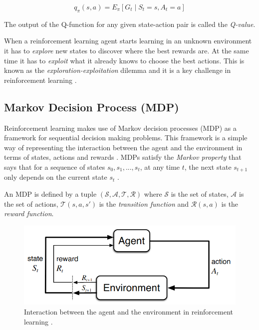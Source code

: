 \begin{equation}
q_\pi \left( s,a \right) = E_\pi \left[ G_{t}\mid S_{t}=s,A_{t}=a \right] 
\label{eq:q-function}
\end{equation}


The output of the Q-function for any given state-action pair is called the \textit{Q-value}. 

When a reinforcement learning agent starts learning in an unknown environment it has to \textit{explore} new states to discover where the best rewards are. At the same time it has to \textit{exploit} what it already knows to choose the best actions. This is known as the \textit{exploration-exploitation }dilemma and it is a key challenge in reinforcement learning \cite{Sutton:1998}.


\subsection{Markov Decision Process (MDP)}
\label{subsection:MDP}

Reinforcement learning makes use of Markov decision processes (MDP) as a framework for sequential decision making problems. This framework is a simple way of representing the interaction between the agent and the environment in terms of states, actions and rewards \cite{Sutton:1998}. MDPs satisfy the \textit{Markov property} that says that for a sequence of states $s_0, s_1, ..., s_t$, at any time $t$, the next state $s_{t+1}$ only depends on the current state $s_t$ \cite{Osa:2018}.

An MDP is defined by a tuple $(\mathcal{S}, \mathcal{A}, \mathcal{T}, \mathcal{R})$ where $\mathcal{S}$ is the set of states, $\mathcal{A}$ is the set of actions, $\mathcal{T}(s, a, s')$ is the \textit{transition function} and $\mathcal{R}(s, a)$ is the \textit{reward function}.

\begin{figure}[H]
    \centering
    \includegraphics[width=.7\textwidth]{figures/reinforcement_learning.png}
    \caption{Interaction between the agent and the environment in reinforcement learning \cite{Sutton:1998}.}
    \label{fig:reinforcement_learning}
\end{figure}

